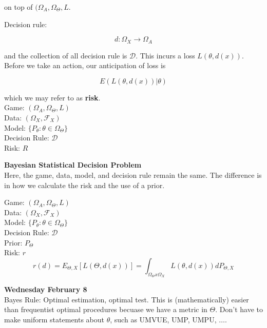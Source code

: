 \documentclass[11pt,fleqn]{book} %
\begin{document}
on top of $(\Omega_A, \Omega_\Theta, L$. 

Decision rule:

		$$d: \Omega_X \rightarrow \Omega_A $$

and the collection of all decision rule is $\mathcal{D}$. This incurs a loss $L(\theta, d(x))$. \\

Before we take an action, our anticipation of loss is 

		$$E(L(\theta, d(x))|\theta) $$

which we may refer to as \textbf{risk}. \\

Game: $(\Omega_A, \Omega_\Theta, L)$\\
Data: $(\Omega_X, \mathcal{F}_X)$\\
Model: $\{P_\theta: \theta \in \Omega_\Theta\}$\\
Decision Rule: $\mathcal{D}$\\
Risk: $R$

\textbf{Bayesian Statistical Decision Problem}\\

Here, the game, data, model, and decision rule remain the same. The difference is in how we calculate the risk and the use of a prior.

Game: $(\Omega_A, \Omega_\Theta, L)$\\
Data: $(\Omega_X, \mathcal{F}_X)$\\
Model: $\{P_\theta: \theta \in \Omega_\Theta\}$\\
Decision Rule: $\mathcal{D}$\\
Prior: $P_\Theta$\\
Risk: $r$\\

		$$r(d) = E_{\Theta, X}[L(\Theta, d(x))] = \int_{\Omega_\Theta x \Omega_X} L(\theta, d(x)) dP_{\Theta, X} $$  



\textbf{Wednesday February 8}\\


Bayes Rule: Optimal estimation, optimal test. This is (mathematically) easier than frequentist optimal procedures becuase we have a metric in $\Theta$. Don't have to make uniform statements about $\theta$, such as UMVUE, UMP, UMPU, $\dots$. \\
\end{document}
